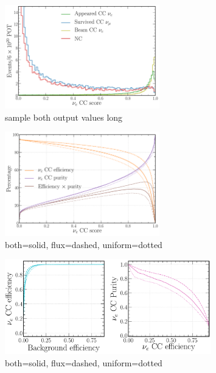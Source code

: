 \begin{figure} %
    \includegraphics[width=0.6\textwidth]{diagrams/6-cvn/chipsnet/sample_both_output_values.pdf}
    \caption[sample both output values short]
    {sample both output values long}
    \label{fig:sample_both_output_values}
\end{figure}

\begin{figure} %
    \includegraphics[width=0.6\textwidth]{diagrams/6-cvn/chipsnet/sample_nuel_eff_curves.pdf}
    \caption[sample nuel eff curves short]
    {both=solid, flux=dashed, uniform=dotted}
    \label{fig:sample_nuel_eff_curves}
\end{figure}

\begin{figure} %
    \includegraphics[width=0.8\textwidth]{diagrams/6-cvn/chipsnet/sample_nuel_comp_curves.pdf}
    \caption[sample nuel comp curves short]
    {both=solid, flux=dashed, uniform=dotted}
    \label{fig:sample_nuel_comp_curves}
\end{figure}

